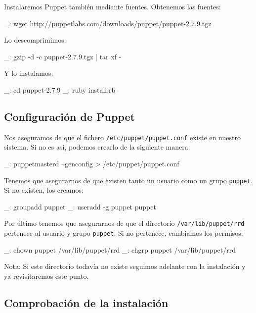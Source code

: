 Instalaremos Puppet también mediante fuentes. Obtenemos las fuentes:

\begin{bashcode}
_: wget http://puppetlabs.com/downloads/puppet/puppet-2.7.9.tgz
\end{bashcode}

Lo descomprimimos:

\begin{bashcode}
_: gzip -d -c puppet-2.7.9.tgz | tar xf -
\end{bashcode}

Y lo instalamos:

\begin{bashcode}
_: cd puppet-2.7.9
_: ruby install.rb
\end{bashcode}


\subsection{Configuración de Puppet}

Nos aseguramos de que el fichero \texttt{/etc/puppet/puppet.conf} existe en nuestro sistema. Si no es así, podemos crearlo de la siguiente manera:

\begin{bashcode}
_: puppetmasterd --genconfig > /etc/puppet/puppet.conf
\end{bashcode}

Tenemos que asegurarnos de que existen tanto un usuario como un grupo \texttt{puppet}. Si no existen, los creamos:

\begin{bashcode}
_: groupadd puppet
_: useradd -g puppet puppet
\end{bashcode}

Por último tenemos que asegurarnos de que el directorio \texttt{/var/lib/puppet/rrd} pertenece al usuario y grupo \texttt{puppet}. Si no pertenece, cambiamos los permisos:

\begin{bashcode}
_: chown puppet /var/lib/puppet/rrd
_: chgrp puppet /var/lib/puppet/rrd
\end{bashcode}

Nota: Si este directorio todavía no existe seguimos adelante con la instalación y ya revisitaremos este punto.


\subsection{Comprobación de la instalación}

